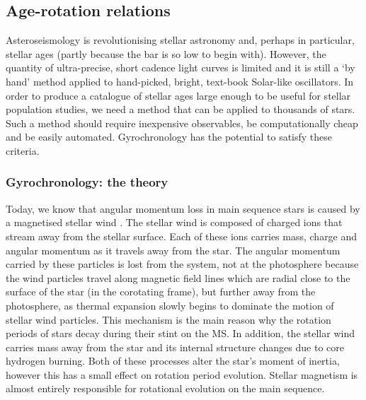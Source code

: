 \subsection{Age-rotation relations}

Asteroseismology is revolutionising stellar astronomy and, perhaps in
particular, stellar ages (partly because the bar is so low to begin with).
However, the quantity of ultra-precise, short cadence light curves is limited
and it is still a `by hand' method applied to hand-picked, bright, text-book
Solar-like oscillators.
In order to produce a catalogue of stellar ages large enough to be useful for
stellar population studies, we need a method that can be applied to thousands
of stars.
Such a method should require inexpensive observables, be computationally cheap
and be easily automated.
Gyrochronology has the potential to satisfy these criteria.

\subsubsection{Gyrochronology: the theory}

Today, we know that angular momentum loss in main sequence stars is caused by
a magnetised stellar wind \citep{Schatzman1962, Weber1967, Mestel1984}.
The stellar wind is composed of charged ions that stream away from the stellar
surface.
Each of these ions carries mass, charge and angular momentum as it travels
away from the star.
The angular momentum carried by these particles is lost from the system, not
at the photosphere because the wind particles travel along magnetic field
lines which are radial close to the surface of the star (in the corotating
frame), but further away from the photosphere, as thermal expansion slowly
begins to dominate the motion of stellar wind particles.
This mechanism is the main reason why the rotation periods of stars decay
during their stint on the MS.
In addition, the stellar wind carries mass away from the star and its
internal structure changes due to core hydrogen burning.
Both of these processes alter the star's moment of inertia, however this has
a small effect on rotation period evolution.
Stellar magnetism is almost entirely responsible for rotational evolution on
the main sequence.

